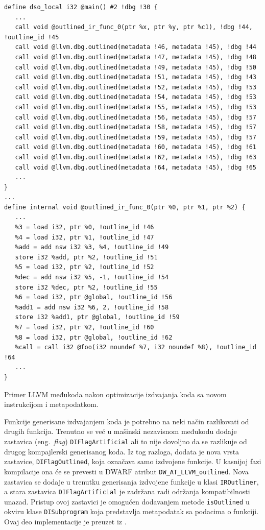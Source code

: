 \documentclass[12pt,oneside]{memoir}
\begin{document}
\begin{listing}
\begin{verbatim}
define dso_local i32 @main() #2 !dbg !30 {
   ...
   call void @outlined_ir_func_0(ptr %x, ptr %y, ptr %c1), !dbg !44, !outline_id !45
   call void @llvm.dbg.outlined(metadata !46, metadata !45), !dbg !44
   call void @llvm.dbg.outlined(metadata !47, metadata !45), !dbg !48
   call void @llvm.dbg.outlined(metadata !49, metadata !45), !dbg !50
   call void @llvm.dbg.outlined(metadata !51, metadata !45), !dbg !43
   call void @llvm.dbg.outlined(metadata !52, metadata !45), !dbg !53
   call void @llvm.dbg.outlined(metadata !54, metadata !45), !dbg !53
   call void @llvm.dbg.outlined(metadata !55, metadata !45), !dbg !53
   call void @llvm.dbg.outlined(metadata !56, metadata !45), !dbg !57
   call void @llvm.dbg.outlined(metadata !58, metadata !45), !dbg !57
   call void @llvm.dbg.outlined(metadata !59, metadata !45), !dbg !57
   call void @llvm.dbg.outlined(metadata !60, metadata !45), !dbg !61
   call void @llvm.dbg.outlined(metadata !62, metadata !45), !dbg !63
   call void @llvm.dbg.outlined(metadata !64, metadata !45), !dbg !65
   ...
}
...
define internal void @outlined_ir_func_0(ptr %0, ptr %1, ptr %2) {
   ...
   %3 = load i32, ptr %0, !outline_id !46
   %4 = load i32, ptr %1, !outline_id !47
   %add = add nsw i32 %3, %4, !outline_id !49
   store i32 %add, ptr %2, !outline_id !51
   %5 = load i32, ptr %2, !outline_id !52
   %dec = add nsw i32 %5, -1, !outline_id !54
   store i32 %dec, ptr %2, !outline_id !55
   %6 = load i32, ptr @global, !outline_id !56
   %add1 = add nsw i32 %6, 2, !outline_id !58
   store i32 %add1, ptr @global, !outline_id !59
   %7 = load i32, ptr %2, !outline_id !60
   %8 = load i32, ptr @global, !outline_id !62
   %call = call i32 @foo(i32 noundef %7, i32 noundef %8), !outline_id !64
   ...
}
\end{verbatim}
\caption{Primer LLVM međukoda nakon optimizacije izdvajanja koda sa novom instrukcijom i metapodatkom.}
\label{lst:outlining_ir_example}
\end{listing}

Funkcije generisane izdvajanjem koda je potrebno na neki način razlikovati od drugih funkcija.
Trenutno se već u mašinski nezavisnom međukodu dodaje zastavica (eng.~{\em flag}) \verb|DIFlagArtificial| ali to nije dovoljno da se razlikuje od drugog kompajlerski generisanog koda.
Iz tog razloga, dodata je nova vrsta zastavice, \verb|DIFlagOutlined|, koja označava samo izdvojene funkcije.
U kasnijoj fazi kompilacije ona će se prevesti u DWARF atribut \verb|DW_AT_LLVM_outlined|.
Nova zastavica se dodaje u trenutku generisanja izdvojene funkcije u klasi \verb|IROutliner|, a stara zastavica \verb|DIFlagArtificial| je zadržana radi održanja kompatibilnosti unazad.
Pristup ovoj zastavici je omogućen dodavanjem metode \verb|isOutlined| u okviru klase \verb|DISubprogram| koja predstavlja metapodatak sa podacima o funkciji.
Ovaj deo implementacije je preuzet iz \cite{tomasevic2022autlajning}.
\end{document}
